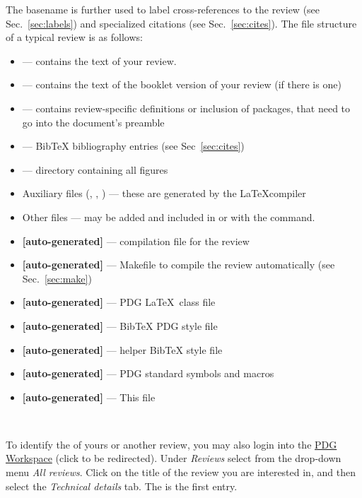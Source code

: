 The basename is further used to label cross-references to the review (see Sec.~\ref{sec:labels}) and specialized citations (see Sec.~\ref{sec:cites}). 
The file structure of a typical review is as follows:
\begin{itemize}
\item {} --- contains the text of your review. 
\item {} --- contains the text of the booklet version of your review (if there is one)
\item {} --- contains review-specific definitions or inclusion of packages, that need to go into the document's preamble
\item {} --- BibTeX bibliography entries (see Sec~\ref{sec:cites})
\item {} --- directory containing all figures
\item Auxiliary files (, , ) --- these are generated by the \LaTeX compiler
\item Other  files --- may be added and included in  or  with the \lstinline{} command.
\item \textbf{[auto-generated]}  --- compilation file for the review
\item \textbf{[auto-generated]}  --- Makefile to compile the review automatically (see Sec.~\ref{sec:make})
\item \textbf{[auto-generated]}  --- PDG \LaTeX \ class file
\item \textbf{[auto-generated]}  --- BibTeX PDG style file
\item \textbf{[auto-generated]}  --- helper BibTeX style file
\item \textbf{[auto-generated]}  --- PDG standard symbols and macros
\item \textbf{[auto-generated]}  --- This file
\end{itemize}

\begin{center}
~\\
\end{center}
To identify the   of yours or another review, you may also login into the 
\href{https://pdgworkspace.lbl.gov/Reviews.action}{PDG Workspace} (click to be redirected). 
Under \emph{Reviews} select from the drop-down menu \emph{All reviews}. 
Click on the title of the review you are interested in, and then select the \emph{Technical details} tab. 
The  is the first entry.

